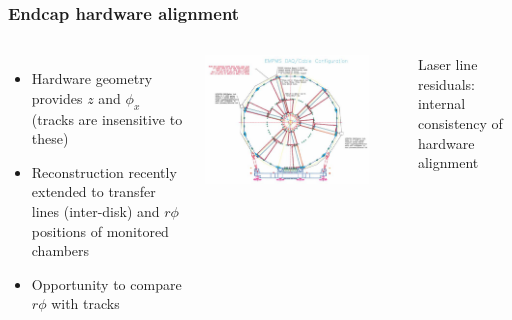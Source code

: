 \documentclass[compress]{beamer}
\begin{document}
\begin{frame}
\frametitle{Endcap hardware alignment}

\begin{columns}

\begin{itemize}
\item Hardware geometry provides $z$ and $\phi_x$ (tracks are insensitive to these)
\item Reconstruction recently extended to transfer lines (inter-disk)
  and $r\phi$ positions of monitored chambers
\item Opportunity to compare $r\phi$ with tracks
\end{itemize}

\includegraphics[width=\linewidth]{slm_lines.png}

\vspace{1 cm}
\mbox{ }

Laser line residuals: internal consistency of hardware alignment


\end{columns}
\end{frame}
\end{document}
